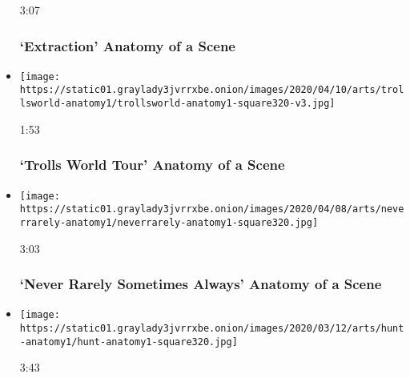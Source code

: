 \begin{itemize}
  3:07

  \hypertarget{extraction--anatomy-of-a-scene}{%
  \subsubsection{`Extraction' \textbar{} Anatomy of a
  Scene}\label{extraction--anatomy-of-a-scene}}
\item
  \href{https://www.nytimes3xbfgragh.onion/video/movies/100000007082524/trolls-world-tour-scene.html?action=click\&module=video-series-bar\&region=header\&pgtype=Article\&playlistId=video/anatomy-of-a-scene}{}

  \texttt{[image: https://static01.graylady3jvrrxbe.onion/images/2020/04/10/arts/trollsworld-anatomy1/trollsworld-anatomy1-square320-v3.jpg]}

  1:53

  \hypertarget{trolls-world-tour--anatomy-of-a-scene}{%
  \subsubsection{`Trolls World Tour' \textbar{} Anatomy of a
  Scene}\label{trolls-world-tour--anatomy-of-a-scene}}
\item
  \href{https://www.nytimes3xbfgragh.onion/video/movies/100000007072967/never-rarely-sometimes-always-scene.html?action=click\&module=video-series-bar\&region=header\&pgtype=Article\&playlistId=video/anatomy-of-a-scene}{}

  \texttt{[image: https://static01.graylady3jvrrxbe.onion/images/2020/04/08/arts/neverrarely-anatomy1/neverrarely-anatomy1-square320.jpg]}

  3:03

  \hypertarget{never-rarely-sometimes-always--anatomy-of-a-scene}{%
  \subsubsection{`Never Rarely Sometimes Always' \textbar{} Anatomy of a
  Scene}\label{never-rarely-sometimes-always--anatomy-of-a-scene}}
\item
  \href{https://www.nytimes3xbfgragh.onion/video/movies/100000007031614/the-hunt-scene.html?action=click\&module=video-series-bar\&region=header\&pgtype=Article\&playlistId=video/anatomy-of-a-scene}{}

  \texttt{[image: https://static01.graylady3jvrrxbe.onion/images/2020/03/12/arts/hunt-anatomy1/hunt-anatomy1-square320.jpg]}

  3:43


\end{itemize}
